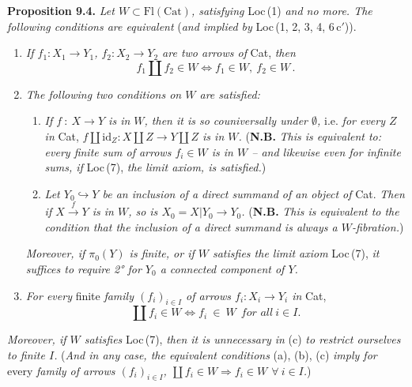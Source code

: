 \documentclass[11pt]{article}
\newcommand{\printedpage}[1]{\marginpar{\footnotesize p.~#1}}
\newcommand{\msp}[1]{\marginpar{\footnotesize [#1]}}
\newcommand{\Cat}{\mathrm{Cat}}
\newcommand{\id}{\mathrm{id}}
\newcommand{\Fl}{\mathrm{Fl}}
\begin{document}
\textbf{Proposition 9.4.} \textit{Let $W\subset\Fl(\Cat)$, satisfying} Loc\,(1) \textit{and no more. The following conditions are equivalent} (\textit{and implied by} Loc\,(1, 2, 3, 4, 6\,c$'$)).
\begin{enumerate}[label={}, leftmargin=2.5em]
\item[a)] \textit{If $f_1 : X_1\longrightarrow Y_1$, $f_2 : X_2\longrightarrow Y_2$ are two arrows of} Cat, \textit{then}
\[
f_1\amalg f_2\in W\iff f_1\in W,\ f_2\in W\,.
\]
\item[b)] \textit{The following two conditions on $W$ are satisfied:}

\msp{page 123}

\begin{enumerate}[label={}, leftmargin=2.5em]
\item[1°)] \textit{If $f\ :\ X\longrightarrow Y$ is in $W$, then it is so couniversally under $\emptyset$,} i.e. \textit{for every $Z$ in} Cat, \textit{$f\amalg\id_Z : X\amalg Z\longrightarrow Y\amalg Z$ is in $W$.} (\textbf{N.B.} \textit{This is equivalent to: every finite sum of arrows $f_i\in W$ is in $W$ – and likewise even for infinite sums, if} Loc\,(7), \textit{the limit axiom, is satisfied.})
\item[2°)] \textit{Let $Y_0\hookrightarrow Y$ be an inclusion of a direct summand of an object of} Cat. \textit{Then if $X\xrightarrow{\ f\ }Y$ is in $W$, so is $X_0=X|Y_0\longrightarrow Y_0$.} (\textbf{N.B.} \textit{This is equivalent to the condition that the inclusion of a direct summand is always a $W$-fibration.})
\end{enumerate}

\textit{Moreover, if $\pi_0(Y)$ is finite, or if $W$ satisfies the limit axiom} Loc\,(7), \textit{it suffices to require 2° for $Y_0$ a connected component of $Y$.}

\printedpage{67}

\item[c)] \textit{For every} finite \textit{family $(f_i)_{i\in I}$ of arrows $f_i : X_i\longrightarrow Y_i$ in} Cat,
\[
\coprod f_i\in W\iff f_i\ \in\ W\ \ \textit{for all}\ i\in I.
\]
\end{enumerate}
\textit{Moreover, if $W$ satisfies} Loc\,(7), \textit{then it is unnecessary in} (c) \textit{to restrict ourselves to finite $I$.} (\textit{And in any case, the equivalent conditions} (a), (b), (c) \textit{imply for} every \textit{family of arrows $(f_i)_{i\in I}$, $\coprod f_i\in W\Longrightarrow f_i\in W$ $\forall\ i\in I$.})
\end{document}
